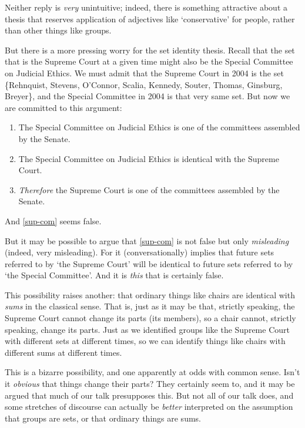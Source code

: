 \documentclass[12pt,twoside]{reedfancy}
\begin{document}
\begin{spacing}{1.25}
Neither reply is {\em very} unintuitive; indeed, there is something
attractive about a thesis that reserves application of adjectives like
`conservative' for people, rather than other things like groups.

But there is a more pressing worry for the set identity thesis.
Recall that the set that is the Supreme Court at a given time might
also be the Special Committee on Judicial Ethics.  We must admit that
the Supreme Court in 2004 is the set \{Rehnquist, Stevens, O'Connor,
Scalia, Kennedy, Souter, Thomas, Ginsburg, Breyer\}, and the Special
Committee in 2004 is that very same set.  But now we are committed to
this argument:

\begin{enumerate}[ref=(\arabic*)]
  \item The Special Committee on Judicial Ethics is one of the
    committees assembled by the Senate.

  \item The Special Committee on Judicial Ethics is identical with the
    Supreme Court.

  \item {\em Therefore} the Supreme Court is one of the committees
    assembled by the
    Senate. \citep[144]{uzquiano2004a} \label{sup-com}
\end{enumerate}

And \ref{sup-com} seems false.

But it may be possible to argue that \ref{sup-com} is not false but
only {\em misleading} (indeed, very misleading).  For it
(conversationally) implies that future sets referred to by `the
Supreme Court' will be identical to future sets referred to by `the
Special Committee'.  And it is {\em this} that is certainly false.

This possibility raises another: that ordinary things like chairs are
identical with {\em sums} in the classical sense.  That is, just as it
may be that, strictly speaking, the Supreme Court cannot change its
parts (its members), so a chair cannot, strictly speaking, change its
parts.  Just as we identified groups like the Supreme Court with
different sets at different times, so we can identify things like
chairs with different sums at different times.

This is a bizarre possibility, and one apparently at odds with common
sense.  Isn't it {\em obvious} that things change their parts?  They
certainly seem to, and it may be argued that much of our talk
presupposes this.  But not all of our talk does, and some stretches of
discourse can actually be {\em better} interpreted on the assumption
that groups are sets, or that ordinary things are sums.


\end{spacing}
\end{document}
